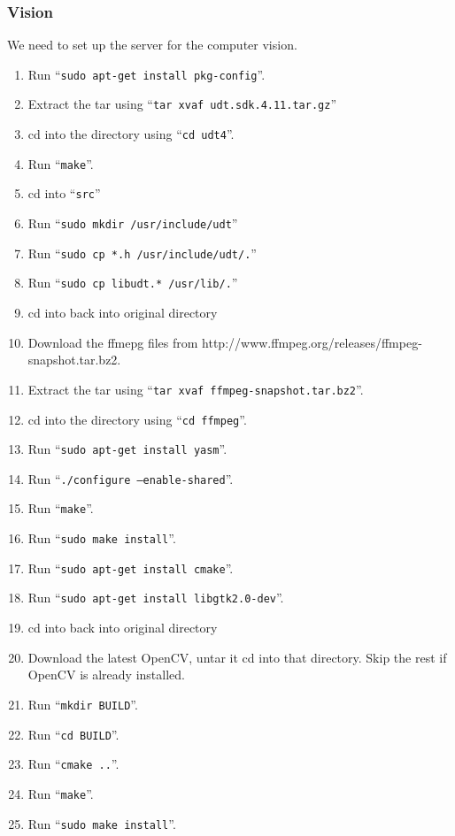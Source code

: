 \documentclass{article}
\begin{document}
\subsubsection{Vision}
We need to set up the server for the computer vision.

\begin{enumerate}
    \item Run ``{\tt sudo apt-get install pkg-config}''.
    \item Extract the tar using ``{\tt tar xvaf udt.sdk.4.11.tar.gz}''
    \item cd into the directory using ``{\tt cd udt4}''.
    \item Run ``{\tt make}''.
    \item cd into ``{\tt src}''
    \item Run ``{\tt sudo mkdir /usr/include/udt}''
    \item Run ``{\tt sudo cp *.h /usr/include/udt/.}''
    \item Run ``{\tt sudo cp libudt.* /usr/lib/.}''
    \item cd into back into original directory
    \item Download the ffmepg files from http://www.ffmpeg.org/releases/ffmpeg-snapshot.tar.bz2.
    \item Extract the tar using ``{\tt tar xvaf ffmpeg-snapshot.tar.bz2}''.
    \item cd into the directory using ``{\tt cd ffmpeg}''.
    \item Run ``{\tt sudo apt-get install yasm}''.
    \item Run ``{\tt ./configure --enable-shared}''.
    \item Run ``{\tt make}''.
    \item Run ``{\tt sudo make install}''.
    \item Run ``{\tt sudo apt-get install cmake}''.
    \item Run ``{\tt sudo apt-get install libgtk2.0-dev}''.
    \item cd into back into original directory
    \item Download the latest OpenCV, untar it cd into that directory. Skip the rest if OpenCV is already installed.
    \item Run ``{\tt mkdir BUILD}''.
    \item Run ``{\tt cd BUILD}''.
    \item Run ``{\tt cmake ..}''.
    \item Run ``{\tt make}''.
    \item Run ``{\tt sudo make install}''.
\end{enumerate}
\end{document}
